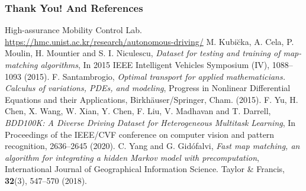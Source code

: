\documentclass[aspectratio=169, bigfiles]{beamer}
\begin{document}

    
    

\begin{frame}
\frametitle{Thank You! And References}

\begin{thebibliography}{9}
\scriptsize{


  High-assurance Mobility Control Lab. \url{https://hmc.unist.ac.kr/research/autonomous-driving/}
 M. Kubi\u cka, A. Cela, P. Moulin, H. Mountier and S. I. Niculescu, \textit{Dataset for testing and training of map-matching algorithms}, In 2015 IEEE Intelligent Vehicles Symposium (IV), 1088--1093 (2015).
 F. Santambrogio, \textit{Optimal transport for applied mathematicians. Calculus of variations, PDEs, and modeling}, Progress in Nonlinear Differential Equations and their Applications, Birkh\"{a}user/Springer, Cham. (2015).
 F. Yu, H. Chen, X. Wang, W. Xian, Y. Chen, F. Liu, V. Madhavan and T. Darrell, \textit{BDD100K: A Diverse Driving Dataset for Heterogeneous Multitask Learning}, In Proceedings of the IEEE/CVF conference on computer vision and pattern recognition, 2636--2645 (2020).
 C. Yang and G. Gid\' ofalvi, \textit{Fast map matching, an algorithm for integrating a hidden Markov model with precomputation}, International Journal of Geographical Information Science. Taylor \& Francis, \textbf{32}(3), 547--570 (2018).}
\end{thebibliography}

\end{frame}
\end{document}
